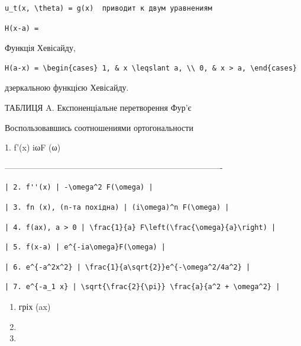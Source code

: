 \documentclass[
  ukrainian,
]{article}
\begin{document}
\begin{verbatim}
u_t(x, \theta) = g(x)  приводит к двум уравнениям
\end{verbatim}

\begin{verbatim}
H(x-a) =
\end{verbatim}

Функція Хевісайду,

\begin{verbatim}
H(a-x) = \begin{cases} 1, & x \leqslant a, \\ 0, & x > a, \end{cases}
\end{verbatim}

дзеркальною функцією Хевісайду.

ТАБЛИЦЯ A. Експоненціальне перетворення Фур'є

Воспользовавшись соотношениями ортогональности

1. f'(x) \textbar{} iωF (ω) \textbar{}

\textbar------------------------------\textbar-------------------------------------------------\textbar{}

\begin{verbatim}
| 2. f''(x) | -\omega^2 F(\omega) |
\end{verbatim}

\begin{verbatim}
| 3. fn (x), (n-та похідна) | (i\omega)^n F(\omega) |
\end{verbatim}

\begin{verbatim}
| 4. f(ax), a > 0 | \frac{1}{a} F\left(\frac{\omega}{a}\right) |
\end{verbatim}

\begin{verbatim}
| 5. f(x-a) | e^{-ia\omega}F(\omega) |
\end{verbatim}

\begin{verbatim}
| 6. e^{-a^2x^2} | \frac{1}{a\sqrt{2}}e^{-\omega^2/4a^2} |
\end{verbatim}

\begin{verbatim}
| 7. e^{-a_1 x} | \sqrt{\frac{2}{\pi}} \frac{a}{a^2 + \omega^2} |
\end{verbatim}

\begin{enumerate}
\def\labelenumi{\arabic{enumi}.}
\setcounter{enumi}{19}
\item
  гріх (ax)
\item
\item
\end{enumerate}
\end{document}
